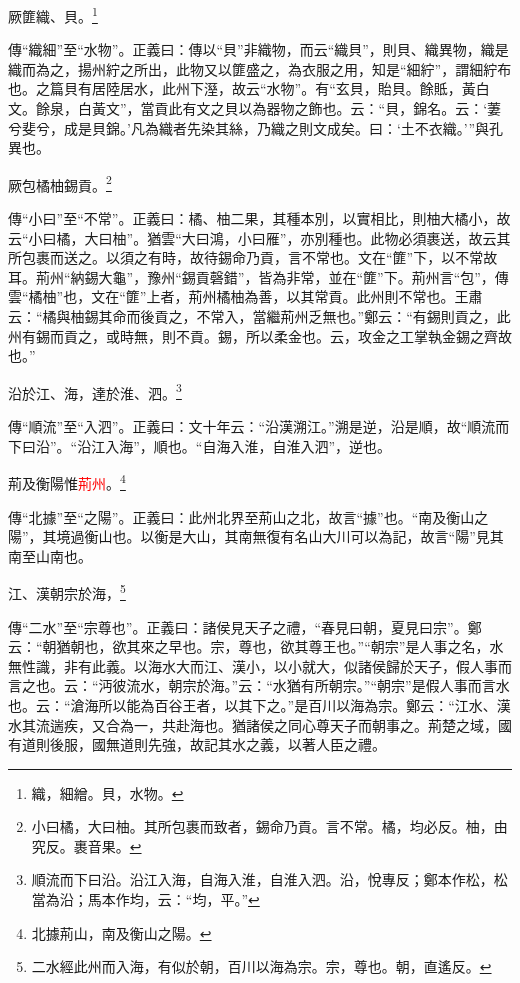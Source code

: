 厥篚織、貝。\footnote{織，細繒。貝，水物。}

{\noindent\zhuan{}\fzbyks 傳“織細”至“水物”。正義曰：傳以“貝”非織物，而云“織貝”，則貝、織異物，織是織而為之，揚州紵之所出，此物又以篚盛之，為衣服之用，知是“細紵”，謂細紵布也。之篇貝有居陸居水，此州下溼，故云“水物”。有“玄貝，貽貝。餘貾，黃白文。餘泉，白黃文”，當貢此有文之貝以為器物之飾也。云：“貝，錦名。云：‘萋兮斐兮，成是貝錦。’凡為織者先染其絲，乃織之則文成矣。曰：‘土不衣織。’”與孔異也。 \par}

厥包橘柚錫貢。\footnote{小曰橘，大曰柚。其所包裹而致者，錫命乃貢。言不常。橘，均必反。柚，由究反。裹音果。}

{\noindent\zhuan{}\fzbyks 傳“小曰”至“不常”。正義曰：橘、柚二果，其種本別，以實相比，則柚大橘小，故云“小曰橘，大曰柚”。猶雲“大曰鴻，小曰雁”，亦別種也。此物必須裹送，故云其所包裹而送之。以須之有時，故待錫命乃貢，言不常也。文在“篚”下，以不常故耳。荊州“納錫大龜”，豫州“錫貢磬錯”，皆為非常，並在“篚”下。荊州言“包”，傳雲“橘柚”也，文在“篚”上者，荊州橘柚為善，以其常貢。此州則不常也。王肅云：“橘與柚錫其命而後貢之，不常入，當繼荊州乏無也。”鄭云：“有錫則貢之，此州有錫而貢之，或時無，則不貢。錫，所以柔金也。云，攻金之工掌執金錫之齊故也。” \par}

沿於江、海，達於淮、泗。\footnote{順流而下曰沿。沿江入海，自海入淮，自淮入泗。沿，悅專反；鄭本作松，松當為沿；馬本作均，云：“均，平。”}

{\noindent\zhuan{}\fzbyks 傳“順流”至“入泗”。正義曰：文十年云：“沿漢溯江。”溯是逆，沿是順，故“順流而下曰沿”。“沿江入海”，順也。“自海入淮，自淮入泗”，逆也。 \par}

荊及衡陽惟\textcolor{red}{荊州}。\footnote{北據荊山，南及衡山之陽。}

{\noindent\zhuan{}\fzbyks 傳“北據”至“之陽”。正義曰：此州北界至荊山之北，故言“據”也。“南及衡山之陽”，其境過衡山也。以衡是大山，其南無復有名山大川可以為記，故言“陽”見其南至山南也。 \par}

江、漢朝宗於海，\footnote{二水經此州而入海，有似於朝，百川以海為宗。宗，尊也。朝，直遙反。}

{\noindent\zhuan{}\fzbyks 傳“二水”至“宗尊也”。正義曰：諸侯見天子之禮，“春見曰朝，夏見曰宗”。鄭云：“朝猶朝也，欲其來之早也。宗，尊也，欲其尊王也。”“朝宗”是人事之名，水無性識，非有此義。以海水大而江、漢小，以小就大，似諸侯歸於天子，假人事而言之也。云：“沔彼流水，朝宗於海。”云：“水猶有所朝宗。”“朝宗”是假人事而言水也。云：“滄海所以能為百谷王者，以其下之。”是百川以海為宗。鄭云：“江水、漢水其流遄疾，又合為一，共赴海也。猶諸侯之同心尊天子而朝事之。荊楚之域，國有道則後服，國無道則先強，故記其水之義，以著人臣之禮。 \par}


